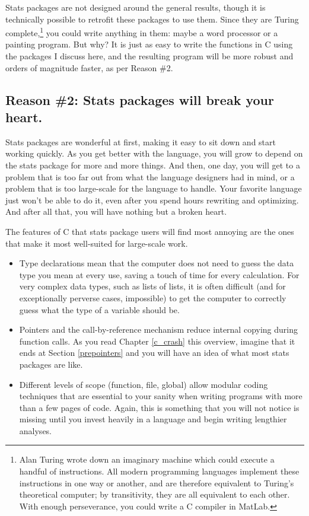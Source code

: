{Stats packages are not designed around the general results, though
it is technically possible to retrofit these packages to use them. Since
they are Turing complete,\footnote{Alan Turing wrote down an imaginary
machine which could execute a handful of instructions.  All
modern programming languages implement these instructions in one way or
another, and are therefore equivalent to Turing's theoretical computer;
by transitivity, they are all equivalent to each other. With enough
perseverance, you could write a C compiler in MatLab.} you could
write anything in them: maybe a word processor or a painting program. But
why? It is just as easy to write the functions in C using the packages I discuss
here, and the resulting program will be more robust and orders of
magnitude faster, as per Reason \#2.
	\fi

\subsection{Reason \#2: Stats packages will break your heart.} Stats packages
are wonderful at first, making it easy to sit down and start working
quickly. As you get better with the language, you will 
grow to depend on the stats package for more and more
things. And then, one day, you will get to a problem that is too far
out from what the language designers had in mind, or a problem that is
too large-scale for the language to handle. Your favorite language just
won't be able to do it, even after you spend hours rewriting and
optimizing.  And after all that, you will have nothing but a broken heart.

The features of C that stats package users will find most annoying are
the ones that make it most well-suited for large-scale work. 
\begin{itemize}
\item Type declarations mean that the computer does not need to guess
the data type you mean at every use, saving a touch of time for every
calculation. For very complex data types,
such as lists of lists, it is often difficult (and for exceptionally
perverse cases, impossible) to get the computer to correctly guess what the
type of a variable should be.
\item Pointers and the call-by-reference mechanism reduce internal copying
during function calls.  As you read \ifbook Chapter \ref{c_crash}\else
this overview\fi, imagine that it ends at Section \ref{prepointers}
and you will have an idea of what most stats packages are like.
\item Different levels of scope (function, file, global) allow modular
coding techniques that are essential
to your sanity when writing programs with more than a few pages of
code. Again, this is something that you will not notice is missing until
you invest heavily in a language and begin writing lengthier analyses.
\end{itemize}

}
